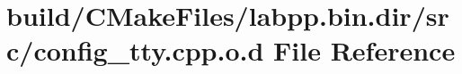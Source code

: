 \hypertarget{build_2CMakeFiles_2labpp_8bin_8dir_2src_2config__tty_8cpp_8o_8d}{}\section{build/\+C\+Make\+Files/labpp.bin.\+dir/src/config\+\_\+tty.cpp.\+o.\+d File Reference}
\label{build_2CMakeFiles_2labpp_8bin_8dir_2src_2config__tty_8cpp_8o_8d}
